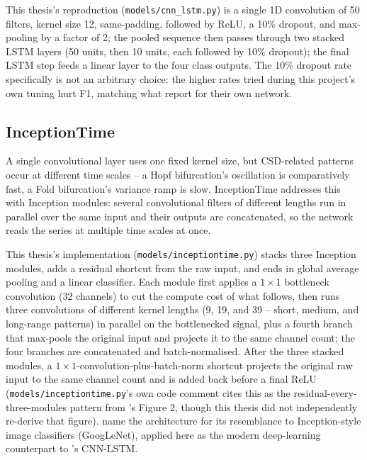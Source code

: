 This thesis's reproduction (\texttt{models/cnn\_lstm.py}) is a single 1D convolution of 50 filters, kernel size 12, same-padding, followed by ReLU, a 10\% dropout, and max-pooling by a factor of 2; the pooled sequence then passes through two stacked LSTM layers (50 units, then 10 units, each followed by 10\% dropout); the final LSTM step feeds a linear layer to the four class outputs. The 10\% dropout rate specifically is not an arbitrary choice: the higher rates tried during this project's own tuning hurt F1, matching what \citet{bury2021} report for their own network.

\subsection{InceptionTime}

A single convolutional layer uses one fixed kernel size, but CSD-related patterns occur at different time scales -- a Hopf bifurcation's oscillation is comparatively fast, a Fold bifurcation's variance ramp is slow. InceptionTime \citep{fawaz2020inceptiontime} addresses this with Inception modules: several convolutional filters of different lengths run in parallel over the same input and their outputs are concatenated, so the network reads the series at multiple time scales at once.

This thesis's implementation (\texttt{models/inceptiontime.py}) stacks three Inception modules, adds a residual shortcut from the raw input, and ends in global average pooling and a linear classifier. Each module first applies a $1\times1$ bottleneck convolution (32 channels) to cut the compute cost of what follows, then runs three convolutions of different kernel lengths (9, 19, and 39 -- short, medium, and long-range patterns) in parallel on the bottlenecked signal, plus a fourth branch that max-pools the original input and projects it to the same channel count; the four branches are concatenated and batch-normalised. After the three stacked modules, a $1\times1$-convolution-plus-batch-norm shortcut projects the original raw input to the same channel count and is added back before a final ReLU (\texttt{models/inceptiontime.py}'s own code comment cites this as the residual-every-three-modules pattern from \citet{fawaz2020inceptiontime}'s Figure 2, though this thesis did not independently re-derive that figure). \citet{fawaz2020inceptiontime} name the architecture for its resemblance to Inception-style image classifiers (GoogLeNet), applied here as the modern deep-learning counterpart to \citet{bury2021}'s CNN-LSTM.

